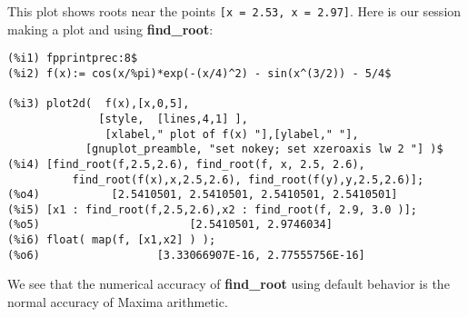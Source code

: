 \documentclass[12pt]{article}
\begin{document}
This plot shows roots near the points \verb|[x = 2.53, x = 2.97]|.
\newpage
Here is our session making a plot and using \textbf{find\_root}:
\small
\begin{verbatim}
(%i1) fpprintprec:8$
(%i2) f(x):= cos(x/%pi)*exp(-(x/4)^2) - sin(x^(3/2)) - 5/4$

(%i3) plot2d(  f(x),[x,0,5],
              [style,  [lines,4,1] ],
               [xlabel," plot of f(x) "],[ylabel," "],
            [gnuplot_preamble, "set nokey; set xzeroaxis lw 2 "] )$
(%i4) [find_root(f,2.5,2.6), find_root(f, x, 2.5, 2.6),
          find_root(f(x),x,2.5,2.6), find_root(f(y),y,2.5,2.6)];
(%o4)           [2.5410501, 2.5410501, 2.5410501, 2.5410501]
(%i5) [x1 : find_root(f,2.5,2.6),x2 : find_root(f, 2.9, 3.0 )];
(%o5)                       [2.5410501, 2.9746034]
(%i6) float( map(f, [x1,x2] ) );
(%o6)                  [3.33066907E-16, 2.77555756E-16]
\end{verbatim}
\normalsize
We see that the numerical accuracy of \textbf{find\_root} using default
  behavior is the normal accuracy of Maxima arithmetic.\\

%  
\end{document}
